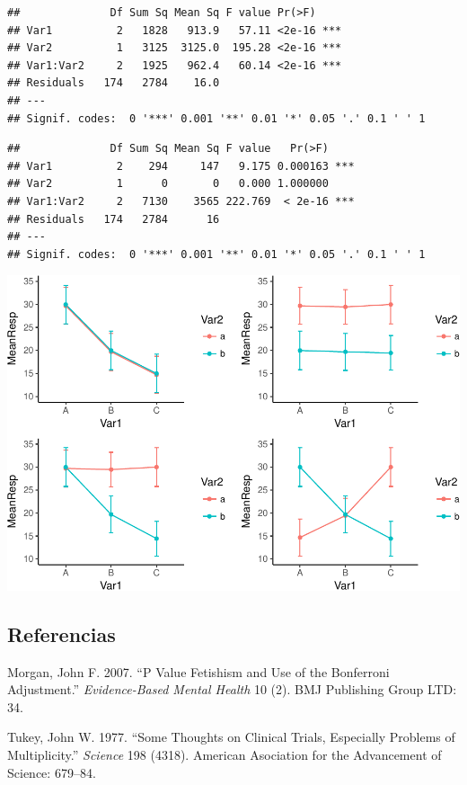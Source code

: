 \documentclass[]{article}
\begin{document}
\begin{verbatim}
##              Df Sum Sq Mean Sq F value Pr(>F)    
## Var1          2   1828   913.9   57.11 <2e-16 ***
## Var2          1   3125  3125.0  195.28 <2e-16 ***
## Var1:Var2     2   1925   962.4   60.14 <2e-16 ***
## Residuals   174   2784    16.0                   
## ---
## Signif. codes:  0 '***' 0.001 '**' 0.01 '*' 0.05 '.' 0.1 ' ' 1
\end{verbatim}

\begin{verbatim}
##              Df Sum Sq Mean Sq F value   Pr(>F)    
## Var1          2    294     147   9.175 0.000163 ***
## Var2          1      0       0   0.000 1.000000    
## Var1:Var2     2   7130    3565 222.769  < 2e-16 ***
## Residuals   174   2784      16                     
## ---
## Signif. codes:  0 '***' 0.001 '**' 0.01 '*' 0.05 '.' 0.1 ' ' 1
\end{verbatim}

\includegraphics{Guia6_files/figure-latex/unnamed-chunk-8-1.pdf}

\subsection*{Referencias}\label{referencias}

\hypertarget{refs}{}
\hypertarget{ref-morgan2007p}{}
Morgan, John F. 2007. ``P Value Fetishism and Use of the Bonferroni
Adjustment.'' \emph{Evidence-Based Mental Health} 10 (2). BMJ Publishing
Group LTD: 34.

\hypertarget{ref-tukey1977some}{}
Tukey, John W. 1977. ``Some Thoughts on Clinical Trials, Especially
Problems of Multiplicity.'' \emph{Science} 198 (4318). American
Asociation for the Advancement of Science: 679--84.
\end{document}
